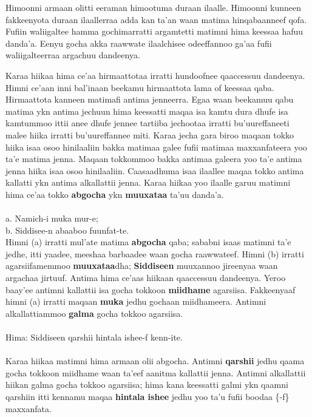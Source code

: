 \documentclass[11pt,b5paper]{book}
\begin{document}
Himoonni armaan olitti eeraman himootuma duraan ilaalle. Himoonni kunneen fakkeenyota duraan ilaallerraa adda kan ta’an waan matima hinqabaanneef qofa. Fufiin waliigaltee hamma gochimarratti argamtetti matimni hima keessaa hafuu danda’a. Eenyu gocha akka raawwate ilaalchisee odeeffannoo
ga’aa fufii waliigalteerraa argachuu dandeenya.

Karaa hiikaa hima ce’aa  hirmaattotaa irratti hundoofnee qaaccessuu dandeenya. Himni ce’aan inni bal’inaan beekamu hirmaattota lama of keessaa qaba. Hirmaattota kanneen matimafi antima jenneerra. Egaa waan beekamuu qabu matima ykn antima jechuun hima keessatti maqaa isa kamtu dura dhufe isa
kamtummoo ittii anee dhufe jennee tartiiba jechootaa irratti bu’uureffaneeti malee hiika irratti bu’uureffannee miti. Karaa jecha gara biroo maqaan tokko hiika isaa osoo hinilaaliin bakka
matimaa galee fufii matimaa maxxanfateera yoo ta’e matima jenna. Maqaan tokkommoo bakka antimaa galeera yoo ta’e antima jenna hiika isaa osoo hinilaaliin. Caasaadhuma isaa ilaallee maqaa tokko antima kallatti ykn antima alkallattii jenna. Karaa hiikaa yoo ilaalle garuu matimni hima ce’aa tokko
\textbf{abgocha} ykn \textbf{muuxataa} ta’uu danda’a.\\
\\
a. Namich-i muka mur-e;\\
b. Siddisee-n abaaboo fuunfat-te. \\

Himni (a) irratti mul’ate matima \textbf{abgocha} qaba; sababni isaas matimni ta’e jedhe, itti yaadee, meeshaa barbaadee waan gocha raawwateef. Himni (b) irratti agarsiifamemmoo \textbf{muuxataa}dha; \textbf{Siddiseen} muuxannoo jireenyaa waan argachaa jirtuuf. Antima hima ce’aas hiikaan qaaccessuu dandeenya. Yeroo baay’ee antimni kallattii isa gocha tokkoon \textbf{miidhame} agarsiisa. Fakkeenyaaf himni (a) irratti maqaan \textbf{muka} jedhu gochaan miidhameera. Antimni alkallattiammoo \textbf{galma} gocha tokkoo agarsiisa. \\
\\
Hima: Siddiseen qarshii hintala ishee-f kenn-ite.\\
\\
Karaa hiikaa matimni hima armaan olii abgocha. Antimni \textbf{qarshii} jedhu qaama gocha tokkoon miidhame waan ta’eef aanitma kallattii jenna. Antimni alkallattii hiikan galma gocha tokkoo agarsiisa; hima kana keessatti galmi ykn qaamni qarshiin itti kennamu maqaa \textbf{hintala ishee }jedhu yoo ta’u fufii boodaa \{-f\} maxxanfata. 
\end{document}
